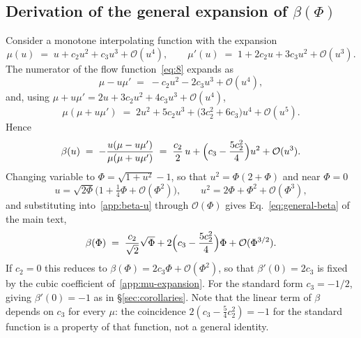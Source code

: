 \documentclass[11pt]{article}
\theoremstyle{plain}
\begin{document}
\subsection{Derivation of the general expansion of \texorpdfstring{$\beta(\Phi)$}{beta(Phi)}}
\label{app:general-derivation}

Consider a monotone interpolating function with the expansion
\begin{equation}
\mu(u) \;=\; u + c_{2}u^{2} + c_{3}u^{3} + \mathcal{O}(u^{4}),
\qquad
\mu'(u) \;=\; 1 + 2c_{2}u + 3c_{3}u^{2} + \mathcal{O}(u^{3}).
\label{app:mu-expansion}
\end{equation}
The numerator of the flow function~\eqref{eq:8} expands as
\begin{equation}
\mu - u\mu' \;=\; -c_{2}u^{2} - 2c_{3}u^{3} + \mathcal{O}(u^{4}),
\label{app:numerator}
\end{equation}
and, using $\mu+u\mu' = 2u + 3c_{2}u^{2} + 4c_{3}u^{3} + \mathcal{O}(u^{4})$,
\begin{equation}
\mu(\mu+u\mu') \;=\; 2u^{2} + 5c_{2}u^{3}
                   + \bigl(3c_{2}^{2}+6c_{3}\bigr)u^{4} + \mathcal{O}(u^{5}).
\label{app:denominator}
\end{equation}
Hence
\begin{equation}
\beta(u) \;=\; -\frac{u(\mu-u\mu')}{\mu(\mu+u\mu')}
       \;=\; \frac{c_{2}}{2}\,u
             + \Bigl(c_{3}-\frac{5c_{2}^{2}}{4}\Bigr)u^{2}
             + \mathcal{O}(u^{3}).
\label{app:beta-u}
\end{equation}
Changing variable to $\Phi=\sqrt{1+u^{2}}-1$, so that $u^{2}=\Phi(2+\Phi)$ and
near $\Phi=0$
\begin{equation}
u=\sqrt{2\Phi}\bigl(1+\tfrac14\Phi+\mathcal{O}(\Phi^{2})\bigr),
\qquad
u^{2}=2\Phi+\Phi^{2}+\mathcal{O}(\Phi^{3}),
\label{app:u-of-Phi}
\end{equation}
and substituting into~\eqref{app:beta-u} through $\mathcal{O}(\Phi)$ gives
Eq.~\eqref{eq:general-beta} of the main text,
\begin{equation}
\beta(\Phi) \;=\; \frac{c_{2}}{\sqrt2}\sqrt{\Phi}
                 + 2\Bigl(c_{3}-\frac{5c_{2}^{2}}{4}\Bigr)\Phi
                 + \mathcal{O}(\Phi^{3/2}).
\label{app:general-beta-derived}
\end{equation}
If $c_{2}=0$ this reduces to $\beta(\Phi)=2c_{3}\Phi+\mathcal{O}(\Phi^{2})$, so
that $\beta'(0)=2c_{3}$ is fixed by the cubic coefficient
of~\eqref{app:mu-expansion}. For the standard form $c_{3}=-1/2$, giving
$\beta'(0)=-1$ as in \S\ref{sec:corollaries}. Note that the linear term of
$\beta$ depends on $c_{3}$ for every $\mu$: the coincidence
$2(c_{3}-\tfrac54c_{2}^{2})=-1$ for the standard function is a property of that
function, not a general identity.
\end{document}

